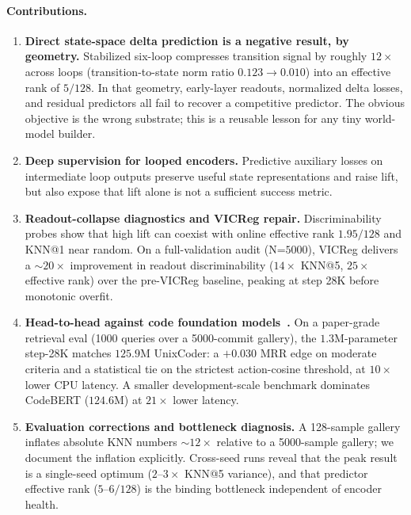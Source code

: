 \paragraph{Contributions.}
\begin{enumerate}
    \item \textbf{Direct state-space delta prediction is a negative
          result, by geometry.}  Stabilized six-loop \CodeWM{}
          compresses transition signal by roughly $12\times$ across
          loops (transition-to-state norm ratio $0.123 \to 0.010$) into
          an effective rank of $5/128$.  In that geometry, early-layer
          readouts, normalized delta losses, and residual predictors
          all fail to recover a competitive predictor.  The obvious
          objective is the wrong substrate; this is a reusable
          lesson for any tiny world-model builder.
    \item \textbf{Deep supervision for looped encoders.}  Predictive
          auxiliary losses on intermediate loop outputs preserve useful
          state representations and raise lift, but also expose that
          lift alone is not a sufficient success metric.
    \item \textbf{Readout-collapse diagnostics and VICReg repair.}
          Discriminability probes show that high lift can coexist with
          online effective rank $1.95/128$ and KNN@1 near random.  On a
          full-validation audit (N=$5000$), VICReg delivers a
          $\sim\!20\times$ improvement in readout discriminability
          ($14\times$ KNN@5, $25\times$ effective rank) over the
          pre-VICReg baseline, peaking at step 28K before monotonic
          overfit.
    \item \textbf{Head-to-head against code foundation
          models~\citep{guo2022unixcoder,feng2020codebert}.}  On a paper-grade retrieval
          eval (1000 queries over a 5000-commit gallery), the
          $1.3$M-parameter step-28K \CodeWM{} matches $125.9$M
          UnixCoder: a $+0.030$ MRR edge on moderate criteria and a
          statistical tie on the strictest action-cosine threshold, at
          $10\times$ lower CPU latency.  A smaller development-scale
          benchmark dominates CodeBERT ($124.6$M) at $21\times$ lower
          latency.
    \item \textbf{Evaluation corrections and bottleneck diagnosis.}
          A 128-sample gallery inflates absolute KNN numbers
          $\sim\!12\times$ relative to a 5000-sample gallery; we
          document the inflation explicitly.  Cross-seed runs reveal
          that the peak result is a single-seed optimum
          ($2\text{--}3\times$ KNN@5 variance), and that predictor
          effective rank ($5\text{--}6/128$) is the binding bottleneck
          independent of encoder health.
\end{enumerate}

